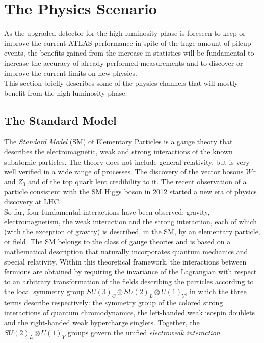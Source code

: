\documentclass[a4paper,twoside,12pt]{book}
\begin{document}
\clearpage

\chapter{The Physics Scenario}\label{sec:physics}

As the upgraded detector for the high luminosity phase is foreseen to keep or improve
the current ATLAS performance in spite of the huge amount of pileup events, the benefits gained from the increase in statistics
will be fundamental to increase the accuracy of already performed measurements and
to discover or improve the current limits on new physics.\\

This section briefly describes some of the physics channels that will mostly benefit
from the high luminosity phase.

\section{The Standard Model}
The \textit{Standard Model} (SM) of Elementary Particles is a gauge theory that describes
the electromagnetic, weak and strong interactions of the known subatomic particles. 
The theory does not include general relativity, but is very well verified in a wide range of
processes. The discovery of the vector bosons $W^{\pm}$ and $Z_{0}$\cite{ZDiscovery} and 
of the top quark\cite{CDFTopDiscovery}\cite{D0TopDiscovery} lent credibility to it. The recent observation of a
particle consistent with the SM Higgs boson\cite{ATLASHiggsDiscovery}\cite{CMSHiggsDiscovery} in 2012 started a new era
of physics discovery at LHC.\\ %

So far, four fundamental interactions have been observed: gravity, electromagnetism, 
the weak interaction and the strong interaction, each of which (with the exception of gravity)
is described, in the SM, by an elementary particle, or field. The SM belongs to the
class of gauge theories and is based on a mathematical description that naturally
incorporates quantum mechanics and special relativity. Within this theoretical framework, the interactions between 
fermions are obtained by requiring the invariance of the
Lagrangian with respect to an arbitrary transformation of the fields describing the particles
according to the local symmetry group $SU (3)_{C} \otimes SU (2)_{L} \otimes U(1)_{Y}$, in which the
three terms describe respectively: the symmetry group of the colored strong interactions
of quantum chromodynamics, the left-handed weak isospin doublets and the right-handed
weak hypercharge singlets. Together, the $SU (2)_{L} \otimes U(1)_{Y}$ groups govern the
unified \textit{electroweak interaction}. \\
\end{document}
